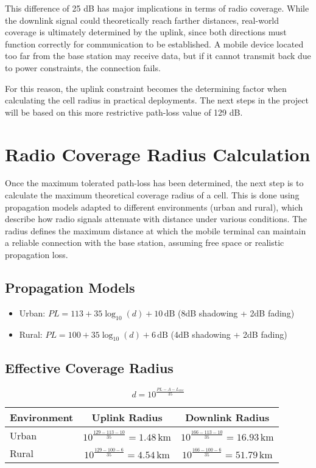 \documentclass[a4paper,12pt]{article}
\begin{document}
This difference of 25 dB has major implications in terms of radio coverage. While the downlink signal could theoretically reach farther distances, real-world coverage is ultimately determined by the uplink, since both directions must function correctly for communication to be established. A mobile device located too far from the base station may receive data, but if it cannot transmit back due to power constraints, the connection fails.

For this reason, the uplink constraint becomes the determining factor when calculating the cell radius in practical deployments. The next steps in the project will be based on this more restrictive path-loss value of 129 dB.

\section{Radio Coverage Radius Calculation}

Once the maximum tolerated path-loss has been determined, the next step is to calculate the maximum theoretical coverage radius of a cell. This is done using propagation models adapted to different environments (urban and rural), which describe how radio signals attenuate with distance under various conditions. The radius defines the maximum distance at which the mobile terminal can maintain a reliable connection with the base station, assuming free space or realistic propagation loss.

\subsection*{Propagation Models}
\begin{itemize}
    \item Urban: \( PL = 113 + 35\log_{10}(d) + 10\,\text{dB} \) (8dB shadowing + 2dB fading)
    \item Rural: \( PL = 100 + 35\log_{10}(d) + 6\,\text{dB} \) (4dB shadowing + 2dB fading)
\end{itemize}

\subsection*{Effective Coverage Radius}
\[
d = 10^{\frac{PL - A - L_{env}}{35}}
\]

\begin{center}
\begin{tabular}{lcc}
\toprule
Environment & Uplink Radius & Downlink Radius \\
\midrule
Urban & \( 10^{\frac{129-113-10}{35}} = 1.48\,\text{km} \) & \( 10^{\frac{166-113-10}{35}} = 16.93\,\text{km} \) \\
Rural & \( 10^{\frac{129-100-6}{35}} = 4.54\,\text{km} \) & \( 10^{\frac{166-100-6}{35}} = 51.79\,\text{km} \) \\
\bottomrule
\end{tabular}
\end{center}
\end{document}
